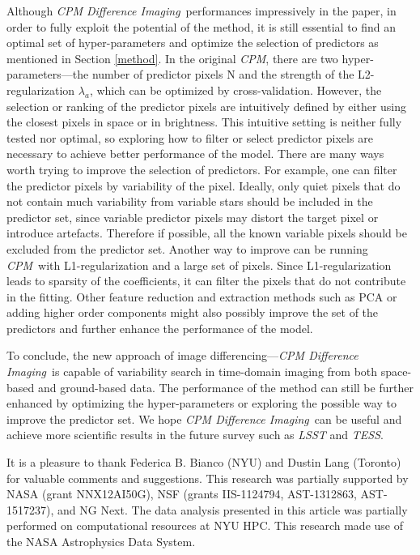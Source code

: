 \documentclass[12pt, preprint]{aastex}
\newcommand{\project}[1]{\textsl{#1}}
\newcommand{\cpm}{\project{CPM}}
\newcommand{\cpmdiff}{\project{CPM Difference Imaging}}
\begin{document}
Although \cpmdiff\ performances impressively in the paper,  in order to fully exploit the potential of the method, it is still essential to find an optimal set of hyper-parameters and optimize the selection of predictors as mentioned in Section \ref{method}. 
In the original \cpm, there are two hyper-parameters---the number of predictor pixels N and the strength of the L2-regularization $\lambda_a$, which can be optimized by cross-validation. 
However, the selection or ranking of the predictor pixels are intuitively defined by either using the closest pixels in space or in brightness.
This intuitive setting is neither fully tested nor optimal, so exploring how to filter or select predictor pixels are necessary to achieve better performance of the model.
There are many ways worth trying to improve the selection of predictors.
For example, one can filter the predictor pixels by variability of the pixel.
Ideally, only quiet pixels that do not contain much variability from variable stars should be included in the predictor set, since variable predictor pixels may distort the target pixel or introduce artefacts.
Therefore if possible, all the known variable pixels should be excluded from the predictor set. 
Another way to improve can be running \cpm\ with L1-regularization and a large set of pixels. 
Since L1-regularization leads to sparsity of the coefficients, it can filter the pixels that do not contribute in the fitting. 
Other feature reduction and extraction methods such as PCA or adding higher order components might also possibly improve the set of the predictors and further enhance the performance of the model. 

To conclude, the new approach of image differencing---\cpmdiff\ is capable of variability search in time-domain imaging from both space-based and ground-based data.
The performance of the method can still be further enhanced by optimizing the hyper-parameters or exploring the possible way to improve the predictor set.
We hope \cpmdiff\ can be useful and achieve more scientific results in the future survey such as \project{LSST} and \project{TESS}.

\acknowledgements
It is a pleasure to thank
  Federica B. Bianco (NYU)
  and
  Dustin Lang (Toronto)
for valuable comments and suggestions.
This research was partially supported by
  NASA (grant NNX12AI50G),
  NSF (grants IIS-1124794, AST-1312863, AST-1517237),
  and NG Next.
The data analysis presented in this article was partially performed on computational resources at NYU HPC.
This research made use of the NASA Astrophysics Data System.


\clearpage

\clearpage
\end{document}
